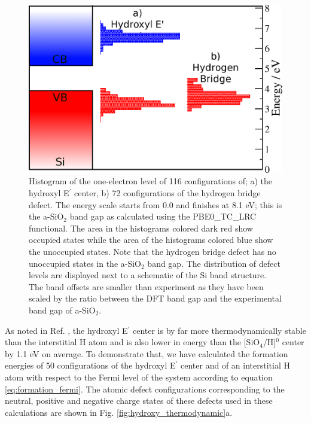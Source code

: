 \documentclass[aps,prb,reprint,superscriptaddress,showpacs]{revtex4-1}
\begin{document}
\begin{figure}[h!]
\includegraphics{hdefects_sisio2.png}
\caption{Histogram of the one-electron level of 116 configurations of; a) the hydroxyl E$^\prime$ center, b) 72 configurations of the hydrogen bridge defect. The energy scale starts from 0.0 and finishes at 8.1 eV; this is the a-SiO$_2$ band gap as calculated using the PBE0\_TC\_LRC functional. The area in the histograms colored dark red show occupied states while the area of the histograms colored blue show the unoccupied states. Note that the hydrogen bridge defect has no unoccupied states in the a-SiO$_2$ band gap. The distribution of defect levels are displayed next to a schematic of the Si band structure. The band offsets are smaller than experiment as they have been scaled by the ratio between the DFT band gap and the experimental band gap of a-SiO$_2$.} 
\label{fig:sio2_h_dos}
\end{figure}

As noted in Ref. \cite{aelsayed_prl}, the hydroxyl E$^\prime$ center is by far more thermodynamically stable than the interstitial H atom and is also lower in energy than the [SiO$_4$/H]$^0$ center by 1.1 eV on average. To demonstrate that, we have calculated the formation energies of 50 configurations of the hydroxyl E$^\prime$ center and of an interstitial H atom with respect to the Fermi level of the system according to equation \ref{eq:formation_fermi}. The atomic defect configurations corresponding to the neutral, positive and negative charge states of these defects used in these calculations are shown in Fig. \ref{fig:hydroxy_thermodynamic}a. 
\end{document}
